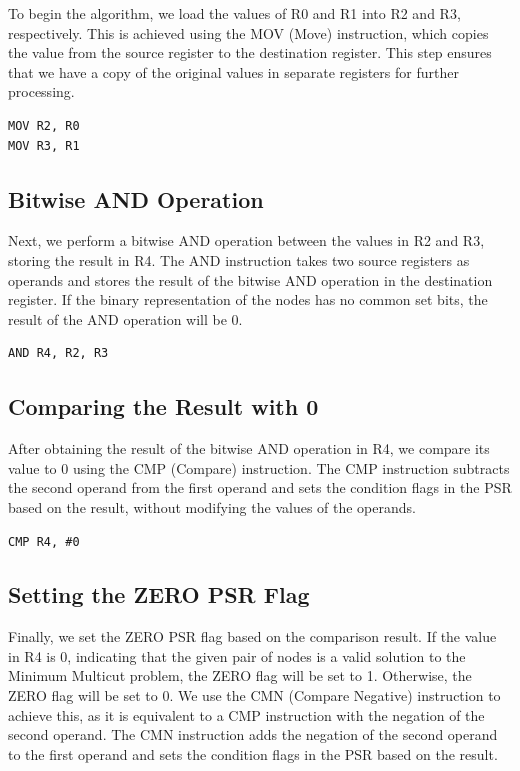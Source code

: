 To begin the algorithm, we load the values of R0 and R1 into R2 and R3, respectively. This is achieved using the MOV (Move) instruction, which copies the value from the source register to the destination register. This step ensures that we have a copy of the original values in separate registers for further processing.

\begin{verbatim}
MOV R2, R0
MOV R3, R1
\end{verbatim}

\subsection{Bitwise AND Operation}

Next, we perform a bitwise AND operation between the values in R2 and R3, storing the result in R4. The AND instruction takes two source registers as operands and stores the result of the bitwise AND operation in the destination register. If the binary representation of the nodes has no common set bits, the result of the AND operation will be 0.

\begin{verbatim}
AND R4, R2, R3
\end{verbatim}

\subsection{Comparing the Result with 0}

After obtaining the result of the bitwise AND operation in R4, we compare its value to 0 using the CMP (Compare) instruction. The CMP instruction subtracts the second operand from the first operand and sets the condition flags in the PSR based on the result, without modifying the values of the operands.

\begin{verbatim}
CMP R4, #0
\end{verbatim}

\subsection{Setting the ZERO PSR Flag}

Finally, we set the ZERO PSR flag based on the comparison result. If the value in R4 is 0, indicating that the given pair of nodes is a valid solution to the Minimum Multicut problem, the ZERO flag will be set to 1. Otherwise, the ZERO flag will be set to 0. We use the CMN (Compare Negative) instruction to achieve this, as it is equivalent to a CMP instruction with the negation of the second operand. The CMN instruction adds the negation of the second operand to the first operand and sets the condition flags in the PSR based on the result.

